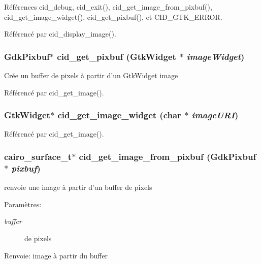 Références cid\_\-debug, cid\_\-exit(), cid\_\-get\_\-image\_\-from\_\-pixbuf(), cid\_\-get\_\-image\_\-widget(), cid\_\-get\_\-pixbuf(), et CID\_\-GTK\_\-ERROR.

Référencé par cid\_\-display\_\-image().
\subsubsection{\setlength{\rightskip}{0pt plus 5cm}GdkPixbuf$\ast$ cid\_\-get\_\-pixbuf (GtkWidget $\ast$ {\em imageWidget})}\label{cid-main_8c_bc0aec7dc3c1566c92317817962763c7}


Crée un buffer de pixels à partir d'un GtkWidget image 

Référencé par cid\_\-get\_\-image().
\subsubsection{\setlength{\rightskip}{0pt plus 5cm}GtkWidget$\ast$ cid\_\-get\_\-image\_\-widget (char $\ast$ {\em imageURI})}\label{cid-main_8c_e9872fe7ad4da4a43bf9ce299a4247d8}




Référencé par cid\_\-get\_\-image().
\subsubsection{\setlength{\rightskip}{0pt plus 5cm}cairo\_\-surface\_\-t$\ast$ cid\_\-get\_\-image\_\-from\_\-pixbuf (GdkPixbuf $\ast$ {\em pixbuf})}\label{cid-main_8c_8f4f280d9555d90279fb07216621a565}


renvoie une image à partir d'un buffer de pixels \begin{Desc}
\item[Paramètres:]
\begin{description}
\item[{\em buffer}]de pixels \end{description}
\end{Desc}
\begin{Desc}
\item[Renvoie:]image à partir du buffer \end{Desc}


